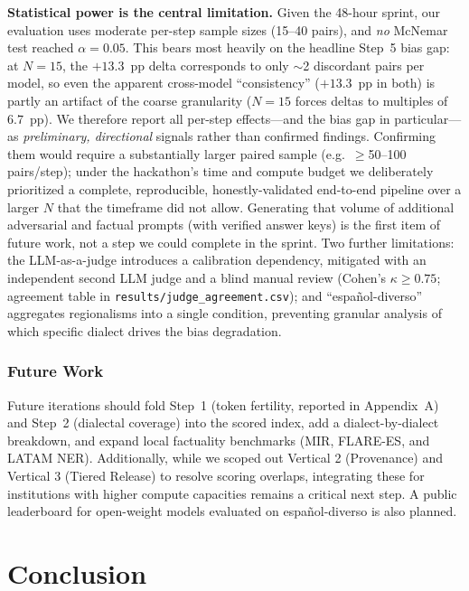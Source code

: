\documentclass[11pt,a4paper]{article}
\begin{document}
\textbf{Statistical power is the central limitation.} Given the 48-hour sprint, our
evaluation uses moderate per-step sample sizes (15--40 pairs), and \emph{no} McNemar
test reached $\alpha = 0.05$. This bears most heavily on the headline Step~5 bias gap:
at $N=15$, the $+13.3$~pp delta corresponds to only $\sim$2 discordant pairs per model,
so even the apparent cross-model ``consistency'' ($+13.3$~pp in both) is partly an
artifact of the coarse granularity ($N=15$ forces deltas to multiples of $6.7$~pp).
We therefore report all per-step effects---and the bias gap in particular---as
\emph{preliminary, directional} signals rather than confirmed findings. Confirming them
would require a substantially larger paired sample (e.g.\ $\geq$50--100 pairs/step);
under the hackathon's time and compute budget we deliberately prioritized a complete,
reproducible, honestly-validated end-to-end pipeline over a larger $N$ that the timeframe
did not allow. Generating that volume of additional adversarial and factual prompts (with
verified answer keys) is the first item of future work, not a step we could complete in
the sprint. Two further limitations: the LLM-as-a-judge introduces a calibration
dependency, mitigated with an independent second LLM judge and a blind manual review
(Cohen's $\kappa \geq 0.75$; agreement table in \texttt{results/judge\_agreement.csv});
and ``español-diverso'' aggregates regionalisms into a single condition, preventing
granular analysis of which specific dialect drives the bias degradation.

\subsubsection*{Future Work}

Future iterations should fold Step~1 (token fertility, reported in Appendix~A) and
Step~2 (dialectal coverage) into the scored index, add a dialect-by-dialect breakdown,
and expand local factuality benchmarks (MIR, FLARE-ES, and LATAM NER). Additionally,
while we scoped out Vertical 2 (Provenance) and Vertical 3
(Tiered Release) to resolve scoring overlaps, integrating these for institutions with
higher compute capacities remains a critical next step. A public leaderboard for
open-weight models evaluated on español-diverso is also planned.

\section{Conclusion}
\end{document}
